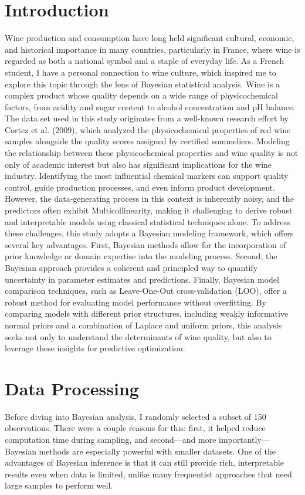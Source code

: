 \documentclass[12pt]{article}
\begin{document}
\section{Introduction}
Wine production and consumption have long held significant cultural, economic, and historical importance in many countries, particularly in France, where wine is regarded as both a national symbol and a staple of everyday life. As a French student, I have a personal connection to wine culture, which inspired me to explore this topic through the lens of Bayesian statistical analysis. Wine is a complex product whose quality depends on a wide range of physicochemical factors, from acidity and sugar content to alcohol concentration and pH balance. The data set used in this study originates from a well-known research effort by Cortez et al. (2009), which analyzed the physicochemical properties of red wine samples alongside the quality scores assigned by certified sommeliers. 
Modeling the relationship between these physicochemical properties and wine quality is not only of academic interest but also has significant implications for the wine industry. Identifying the most influential chemical markers can support quality control, guide production processes, and even inform product development. However, the data-generating process in this context is inherently noisy, and the predictors often exhibit Multicollinearity, making it challenging to derive robust and interpretable models using classical statistical techniques alone.
To address these challenges, this study adopts a Bayesian modeling framework, which offers several key advantages. First, Bayesian methods allow for the incorporation of prior knowledge or domain expertise into the modeling process. Second, the Bayesian approach provides a coherent and principled way to quantify uncertainty in parameter estimates and predictions. Finally, Bayesian model comparison techniques, such as Leave-One-Out cross-validation (LOO), offer a robust method for evaluating model performance without overfitting. By comparing models with different prior structures, including weakly informative normal priors and a combination of Laplace and uniform priors, this analysis seeks not only to understand the determinants of wine quality, but also to leverage these insights for predictive optimization.




\section{Data Processing}
Before diving into Bayesian analysis, I randomly selected a subset of 150 observations. There were a couple reasons for this: first, it helped reduce computation time during sampling, and second—and more importantly—Bayesian methods are especially powerful with smaller datasets. One of the advantages of Bayesian inference is that it can still provide rich, interpretable results even when data is limited, unlike many frequentist approaches that need large samples to perform well.
\end{document}
